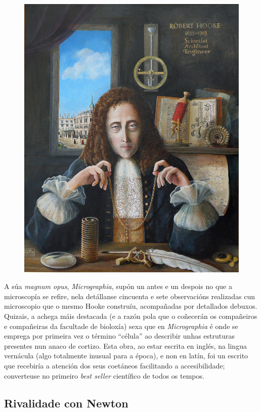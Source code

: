 \begin{refsection}
\begin{multicols}{2}
\begin{figure}
    \centering
    \includegraphics[width=0.8\linewidth]{revistas/002/imaxes/17_Robert_Hooke_Engineer.jpg}
\end{figure}

A súa \textit{magnum opus}, \textit{Micrographia}, supón un antes e un despois
no que a microscopía se refire, nela detállanse cincuenta e sete observacións
realizadas cun microscopio que o mesmo Hooke construíu, acompañadas por
detallados debuxos. Quizais, a achega máis destacada (e a razón pola que o
coñecerán os compañeiros e compañeiras da facultade de bioloxía) sexa que en
\textit{Micrographia} é onde se emprega por primeira vez o término ``célula''
ao describir unhas estruturas presentes nun anaco de cortizo. Esta obra, ao
estar escrita en inglés, na lingua vernácula (algo totalmente inusual para a
época), e non en latín, foi un escrito que recebiría a atención dos seus
coetáneos facilitando a accesibilidade; converteuse no primeiro \textit{best
seller} científico de todos os tempos.

\subsection*{Rivalidade con Newton}


\end{multicols}
\end{refsection}
